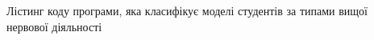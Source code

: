 \append{}
Лістинг коду програми, яка класифікує моделі студентів за типами вищої нервової
діяльності
\lstset{inputencoding=utf8, extendedchars=\true}

